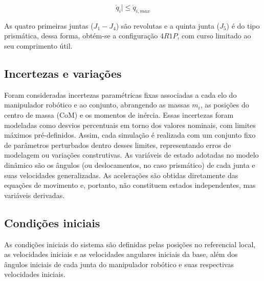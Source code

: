 \begin{equation}
    \label{eq:limites_juntas_aceleracao}
\ddot q_i| \le \ddot q_{i,max}
\end{equation}

As quatro primeiras juntas ($J_1 - J_4$) são revolutas e a quinta junta ($J_5$) é do tipo prismática, dessa forma, obtém-se a configuração $4R1P$, com curso limitado ao seu comprimento útil.

\subsection{Incertezas e variações}
Foram consideradas incertezas paramétricas fixas associadas a cada elo do manipulador robótico e ao conjunto, abrangendo as massas $m_i$, as posições do centro de massa (CoM) e os momentos de inércia.
Essas incertezas foram modeladas como desvios percentuais em torno dos valores nominais, com limites máximos pré-definidos.
Assim, cada simulação é realizada com um conjunto fixo de parâmetros perturbados dentro desses limites, representando erros de modelagem ou variações construtivas.
As variáveis de estado adotadas no modelo dinâmico são os ângulos (ou deslocamentos, no caso prismático) de cada junta e suas velocidades generalizadas.
As acelerações são obtidas diretamente das equações de movimento e, portanto, não constituem estados independentes, mas variáveis derivadas.


\subsection{Condições iniciais}
As condições iniciais do sistema são definidas pelas posições no referencial local, as velocidades iniciais e as velocidades angulares iniciais da base, além dos ângulos iniciais de cada junta do manipulador robótico e suas respectivas velocidades iniciais.
